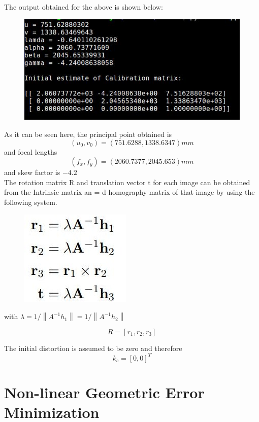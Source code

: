 \documentclass[conference]{IEEEtran}
\newcommand\norm[1]{\left\lVert#1\right\rVert}
\begin{document}
The output obtained for the above is shown below:
\begin{figure}[H]
\centering
\includegraphics[scale = 0.45]{8.jpg}
\label{fig_sim}
\end{figure}

As it can be seen here, the principal point obtained is $$(u_0, v_0) = (751.6288, 1338.6347) mm$$ and focal lengths $$(f_x, f_y) = (2060.7377, 2045.653) mm $$ and skew factor is $-4.2$\\

The rotation matrix R and translation vector t for each image can be obtained from the Intrinsic matrix an = d homography matrix of that image by using the following system. \begin{figure}[H]
\centering
\includegraphics[scale = 0.35]{9.jpg}
\label{fig_sim}
\end{figure}

with $\lambda = 1/ \norm{A^{-1}h_1} = 1/ \norm{A^{-1}h_2}$ 

$$ R = [r_1, r_2, r_3]$$

The initial distortion is assumed to be zero and therefore $$k_c = [0,0]^T$$

\section{Non-linear Geometric Error Minimization}
\end{document}
